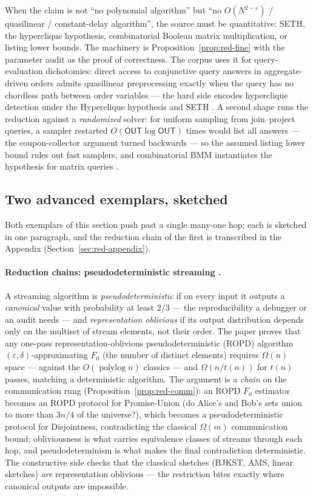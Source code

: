 When the claim is not ``no polynomial algorithm'' but ``no
$O(N^{2-\varepsilon})$ / quasilinear / constant-delay algorithm'', the source must be
quantitative: SETH, the hyperclique hypothesis, combinatorial Boolean matrix
multiplication, or listing lower bounds. The machinery is
Proposition~\ref{prop:red-fine} with the parameter audit as the proof of correctness.
The corpus uses it for query-evaluation dichotomies: direct access to conjunctive
query answers in aggregate-driven orders admits quasilinear preprocessing exactly when
the query has no chordless path between order variables --- the hard side encodes
hyperclique detection under the Hyperclique hypothesis and SETH
\citep{sigmod26-109}\pods. A second shape runs the reduction against a
\emph{randomized} solver: for uniform sampling from join--project queries, a sampler
restarted $O(\mathsf{OUT}\log\mathsf{OUT})$ times would list all answers --- the
coupon-collector argument turned backwards --- so the assumed listing lower bound
rules out fast samplers, and combinatorial BMM instantiates the hypothesis for matrix
queries \citep{sigmod26-243}\pods.

\subsection{Two advanced exemplars, sketched}
\label{sec:red-sketches}

Both exemplars of this section push past a single many-one hop; each is sketched in
one paragraph, and the reduction chain of the first is transcribed in the
Appendix (Section~\ref{sec:red-appendix}).

\paragraph{Reduction chains: pseudodeterministic streaming \citep{sigmod26-357}.}
A streaming algorithm is \emph{pseudodeterministic} if on every input it outputs a
\emph{canonical} value with probability at least $2/3$ --- the reproducibility a
debugger or an audit needs --- and \emph{representation oblivious} if its output
distribution depends only on the multiset of stream elements, not their order. The
paper proves that any one-pass representation-oblivious pseudodeterministic (ROPD)
algorithm $(\varepsilon,\delta)$-approximating $F_0$ (the number of distinct elements)
requires $\Omega(n)$ space --- against the $O(\operatorname{polylog} n)$ classics ---
and $\Omega(n/t(n))$ for $t(n)$ passes, matching a deterministic algorithm. The
argument is a \emph{chain} on the communication rung (Proposition~\ref{prop:red-comm}):
an ROPD $F_0$ estimator becomes an ROPD protocol for Promise-Union (do Alice's and
Bob's sets union to more than $3n/4$ of the universe?), which becomes a
pseudodeterministic protocol for Disjointness, contradicting the classical
$\Omega(m)$ communication bound; obliviousness is what carries equivalence classes of
streams through each hop, and pseudodeterminism is what makes the final contradiction
deterministic. The constructive side checks that the classical sketches (BJKST, AMS,
linear sketches) \emph{are} representation oblivious --- the restriction bites exactly
where canonical outputs are impossible.

